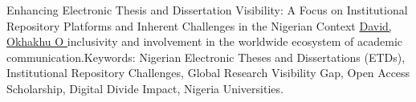 \begin{abstract_online}{Enhancing Electronic Thesis and Dissertation Visibility: A Focus on Institutional Repository Platforms and Inherent Challenges in the Nigerian Context}{%
        \underline{David, Okhakhu O }}
inclusivity and involvement in the worldwide ecosystem of academic communication.Keywords: Nigerian Electronic Theses and Dissertations (ETDs), Institutional Repository Challenges, Global Research Visibility Gap, Open Access Scholarship, Digital Divide Impact, Nigeria Universities.
    \end{abstract_online}
    
